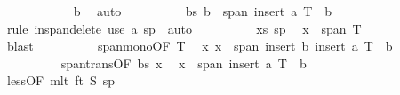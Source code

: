 \begin{isabellebody}
\ \ \ \ \ \ \ \ \ \ \isamarkupfalse%
\ b\ \isamarkupfalse%
\ auto\isanewline
\ \ \ \ \ \ \ \ \isamarkupfalse%
\ bs{\isacharcolon}{\kern0pt}\ {\isachardoublequoteopen}b\ {\isasymin}\ span\ {\isacharparenleft}{\kern0pt}insert\ a\ {\isacharparenleft}{\kern0pt}T\ {\isacharminus}{\kern0pt}\ {\isacharbraceleft}{\kern0pt}b{\isacharbraceright}{\kern0pt}{\isacharparenright}{\kern0pt}{\isacharparenright}{\kern0pt}{\isachardoublequoteclose}\isanewline
\ \ \ \ \ \ \ \ \ \ \isamarkupfalse%
\ {\isacharparenleft}{\kern0pt}rule\ in{\isacharunderscore}{\kern0pt}span{\isacharunderscore}{\kern0pt}delete{\isacharparenright}{\kern0pt}\ {\isacharparenleft}{\kern0pt}use\ a\ sp\ \ auto{\isacharparenright}{\kern0pt}\isanewline
\ \ \ \ \ \ \ \ \isamarkupfalse%
\ xs\ sp\ \isamarkupfalse%
\ {\isachardoublequoteopen}x\ {\isasymin}\ span\ T{\isachardoublequoteclose}\isanewline
\ \ \ \ \ \ \ \ \ \ \isamarkupfalse%
\ blast\isanewline
\ \ \ \ \ \ \ \ \isamarkupfalse%
\ span{\isacharunderscore}{\kern0pt}mono{\isacharbrackleft}{\kern0pt}OF\ T{\isacharbrackright}{\kern0pt}\ \isamarkupfalse%
\ x{\isacharcolon}{\kern0pt}\ {\isachardoublequoteopen}x\ {\isasymin}\ span\ {\isacharparenleft}{\kern0pt}insert\ b\ {\isacharparenleft}{\kern0pt}insert\ a\ {\isacharparenleft}{\kern0pt}T\ {\isacharminus}{\kern0pt}\ {\isacharbraceleft}{\kern0pt}b{\isacharbraceright}{\kern0pt}{\isacharparenright}{\kern0pt}{\isacharparenright}{\kern0pt}{\isacharparenright}{\kern0pt}{\isachardoublequoteclose}\ \isacommand{{\isachardot}{\kern0pt}{\isachardot}{\kern0pt}}\isamarkupfalse%
\isanewline
\ \ \ \ \ \ \ \ \isamarkupfalse%
\ span{\isacharunderscore}{\kern0pt}trans{\isacharbrackleft}{\kern0pt}OF\ bs\ x{\isacharbrackright}{\kern0pt}\ \isamarkupfalse%
\ {\isachardoublequoteopen}x\ {\isasymin}\ span\ {\isacharparenleft}{\kern0pt}insert\ a\ {\isacharparenleft}{\kern0pt}T\ {\isacharminus}{\kern0pt}\ {\isacharbraceleft}{\kern0pt}b{\isacharbraceright}{\kern0pt}{\isacharparenright}{\kern0pt}{\isacharparenright}{\kern0pt}{\isachardoublequoteclose}\ \isacommand{{\isachardot}{\kern0pt}}\isamarkupfalse%
\isanewline
\ \ \ \ \ \ \isamarkupfalse%
\isanewline
\ \ \ \ \ \ \isamarkupfalse%
\ less{\isacharparenleft}{\kern0pt}{}{\isacharparenright}{\kern0pt}{\isacharbrackleft}{\kern0pt}OF\ mlt\ ft{\isacharprime}{\kern0pt}\ S\ sp{\isacharprime}{\kern0pt}{\isacharbrackright}{\kern0pt}\ \isamarkupfalse%

\end{isabellebody}
